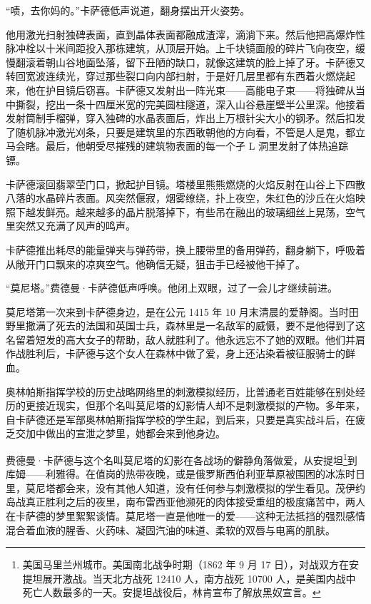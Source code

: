 \documentclass[AutoFakeBold=true]{book}
\begin{document}
``啧，去你妈的。''卡萨德低声说道，翻身摆出开火姿势。

他用激光扫射独碑表面，直到晶体表面都融成渣滓，滴淌下来。然后他把高爆炸性脉冲栓以十米间距投入那栋建筑，从顶层开始。上千块镜面般的碎片飞向夜空，缓慢翻滚着朝山谷地面坠落，留下丑陋的缺口，就像这建筑的脸上掉了牙。卡萨德又转回宽波连续光，穿过那些裂口向内部扫射，于是好几层里都有东西着火燃烧起来，他在护目镜后窃喜。卡萨德又发射出一阵光束——高能电子束——将独碑从当中撕裂，挖出一条十四厘米宽的完美圆柱隧道，深入山谷悬崖壁半公里深。他接着发射筒制手榴弹，穿入独碑的水晶表面后，炸出上万根针尖大小的钢矛。然后扣发了随机脉冲激光刈条，只要是建筑里的东西敢朝他的方向看，不管是人是鬼，都立马会瞎。最后，他朝受尽摧残的建筑物表面的每一个孑 L 洞里发射了体热追踪镖。

卡萨德滚回翡翠茔门口，掀起护目镜。塔楼里熊熊燃烧的火焰反射在山谷上下四散八落的水晶碎片表面。风突然偃寂，烟雾缭绕，扑上夜空，朱红色的沙丘在火焰映照下越发鲜亮。越来越多的晶片脱落掉下，有些吊在融出的玻璃细丝上晃荡，空气里突然又充满了风声的鸣声。

卡萨德推出耗尽的能量弹夹与弹药带，换上腰带里的备用弹药，翻身躺下，呼吸着从敞开门口飘来的凉爽空气。他确信无疑，狙击手已经被他干掉了。

``莫尼塔。''费德曼·卡萨德低声呼唤。他闭上双眼，过了一会儿才继续前进。

\vspace*{1em}

莫尼塔第一次来到卡萨德身边，是在公元 1415 年 10 月末清晨的爱静阁。当时田野里撒满了死去的法国和英国士兵，森林里是一名敌军的威慑，要不是他得到了这名留着短发的高大女子的帮助，敌人就胜利了。他永远忘不了她的双眼。他们并肩作战胜利后，卡萨德与这个女人在森林中做了爱，身上还沾染着被征服骑士的鲜血。

奥林帕斯指挥学校的历史战略网络里的刺激模拟经历，比普通老百姓能够在别处经历的更接近现实，但那个名叫莫尼塔的幻影情人却不是刺激模拟的产物。多年来，自卡萨德还是军部奥林帕斯指挥学校的学生起，到后来，只要是真实战斗后，在疲乏交加中做出的宣泄之梦里，她都会来到他身边。

费德曼·卡萨德与这个名叫莫尼塔的幻影在各战场的僻静角落做爱，从安提坦\footnote{美国马里兰州城市。美国南北战争时期（1862 年 9 月 17 日），对战双方在安提坦展开激战。当天北方战死 12410 人，南方战死 10700 人，是美国内战中死亡人数最多的一天。安提坦战役后，林肯宣布了解放黑奴宣言。}到库姆——利雅得。在值岗的热带夜晚，或是俄罗斯西伯利亚草原被围困的冰冻时日里，莫尼塔都会来，没有其他人知道，没有任何参与刺激模拟的学生看见。茂伊约岛战真正胜利之后的夜里，南布雷西亚他濒死的肉体接受重组的极度痛苦中，两人在卡萨德的梦里絮絮谈情。莫尼塔一直是他唯一的爱——这种无法抵挡的强烈感情混合着血液的腥香、火药味、凝固汽油的味道、柔软的双唇与电离的肌肤。
\end{document}
